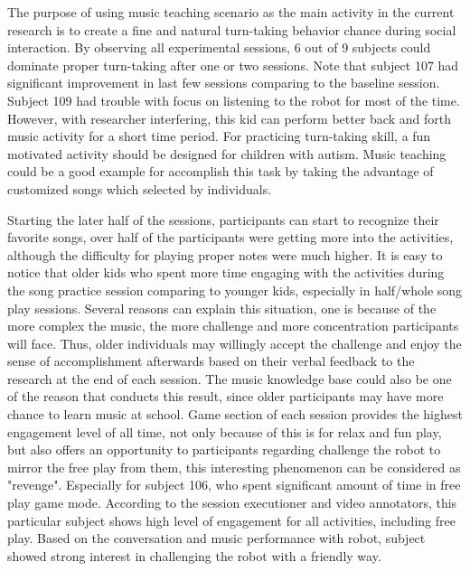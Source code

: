 \documentclass[conference]{IEEEtran}
\begin{document}
The purpose of using music teaching scenario as the main activity in the current research is to 
create a fine and natural turn-taking behavior chance during social interaction. By observing all 
experimental sessions, 6 out of 9 subjects could dominate proper turn-taking after one or two
sessions. Note that subject 107 had significant improvement in last few sessions comparing to the
baseline session. Subject 109 had trouble with focus on listening to the robot for most of the time.
However, with researcher interfering, this kid can perform better back and forth music activity 
for a short time period. For practicing turn-taking skill, a fun motivated activity should be 
designed for children with autism. Music teaching could be a good example for accomplish this
task by taking the advantage of customized songs which selected by individuals.

Starting the later half of the sessions, participants can start to recognize their favorite songs,
over half of the participants were getting more into the activities, although the difficulty for
playing proper notes were much higher. It is easy to notice that older kids who spent more time engaging with the activities 
during the song practice session comparing to younger kids, especially in half/whole song play sessions.
Several reasons can explain this situation, one is because of the more complex the music,
the more challenge and more concentration participants will face. Thus, older individuals may willingly accept the 
challenge and enjoy the sense of accomplishment afterwards based on their verbal feedback to the research at the end of  
each session. The music knowledge base could also be one of the reason that conducts this result, 
since older participants may have more chance to learn music at school. Game section of each 
session provides the highest engagement level of all time, not only because of this is for 
relax and fun play, but also offers an opportunity to participants regarding challenge the 
robot to mirror the free play from them, this interesting phenomenon can be considered as 
"revenge". Especially for subject 106, who spent significant amount of time in free play 
game mode. According to the session executioner and video annotators, this particular subject shows 
high level of engagement for all activities, including free play. Based on the conversation 
and music performance with robot, subject showed strong interest in challenging the robot 
with a friendly way. 
\end{document}

